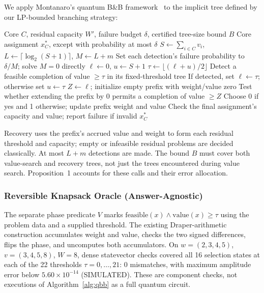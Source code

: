 \documentclass[pdflatex,sn-mathphys-num]{sn-jnl}
\begin{document}
We apply Montanaro's quantum B\&B framework~\cite{ref24} to the implicit tree defined by our LP-bounded branching strategy:


\begin{algorithm}[t]
\caption{Threshold Search and Witness Recovery (Phase 2)}
\label{alg:qbb}
\begin{algorithmic}[1]
\REQUIRE Core $C$, residual capacity $W'$, failure budget $\delta$, certified tree-size bound $B$
\ENSURE Core assignment $x_C^*$, except with probability at most $\delta$
\STATE $S\leftarrow\sum_{i\in C}v_i$, $L\leftarrow\lceil\log_2(S+1)\rceil$, $M\leftarrow L+m$
\STATE Set each detection's failure probability to $\delta/M$; solve $M=0$ directly
\STATE $\ell\leftarrow0$, $u\leftarrow S+1$
    \STATE $\tau\leftarrow\lfloor(\ell+u)/2\rfloor$
    \STATE Detect a feasible completion of value $\ge\tau$ in its fixed-threshold tree
    \STATE If detected, set $\ell\leftarrow\tau$; otherwise set $u\leftarrow\tau$
\ENDWHILE
\STATE $Z\leftarrow\ell$; initialize empty prefix with weight/value zero
    \STATE Test whether extending the prefix by 0 permits a completion of value $\ge Z$
    \STATE Choose 0 if yes and 1 otherwise; update prefix weight and value
\ENDFOR
\STATE Check the final assignment's capacity and value; report failure if invalid
\RETURN $x_C^*$
\end{algorithmic}
\end{algorithm}

Recovery uses the prefix's accrued value and weight to form each residual threshold and capacity; empty or infeasible residual problems are decided classically. At most $L+m$ detections are made. The bound $B$ must cover both value-search and recovery trees, not just the trees encountered during value search. Proposition~1 accounts for these calls and their error allocation.

\subsubsection{Reversible Knapsack Oracle (Answer-Agnostic)}
\label{sec:oracle-impl}

The separate phase predicate $V$ marks $\mathrm{feasible}(x)\wedge\mathrm{value}(x)\ge\tau$ using the problem data and a supplied threshold. The existing Draper-arithmetic construction accumulates weight and value, checks the two signed differences, flips the phase, and uncomputes both accumulators. On $w=(2,3,4,5)$, $v=(3,4,5,8)$, $W=8$, dense statevector checks covered all 16 selection states at each of the 22 thresholds $\tau=0,\ldots,21$: 0 mismatches, with maximum amplitude error below $5.60\times10^{-14}$ (SIMULATED). These are component checks, not executions of Algorithm~\ref{alg:qbb} as a full quantum circuit.
\end{document}
